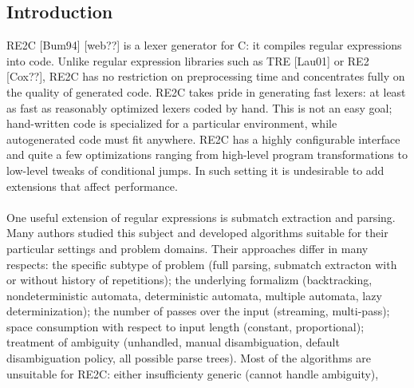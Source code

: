 \documentclass{article}
\theoremstyle{definition}
\begin{document}
\begin{multicols}{2}

\section*{Introduction}

RE2C [Bum94] [web??] is a lexer generator for C: it compiles regular expressions into code.
Unlike regular expression libraries such as TRE [Lau01] or RE2 [Cox??], RE2C has no restriction on preprocessing time
and concentrates fully on the quality of generated code.
RE2C takes pride in generating fast lexers: at least as fast as reasonably optimized lexers coded by hand.
This is not an easy goal; hand-written code is specialized for a particular environment, while autogenerated code must fit anywhere.
RE2C has a highly configurable interface and quite a few optimizations ranging from
high-level program transformations to low-level tweaks of conditional jumps.
In such setting it is undesirable to add extensions that affect performance.
\\ \\
One useful extension of regular expressions is submatch extraction and parsing.
Many authors studied this subject and developed algorithms suitable for their particular settings and problem domains.
Their approaches differ in many respects:
the specific subtype of problem (full parsing, submatch extracton with or without history of repetitions);
the underlying formalizm (backtracking,
nondeterministic automata, deterministic automata, 
multiple automata, lazy determinization);
the number of passes over the input (streaming, multi-pass);
space consumption with respect to input length (constant, proportional);
treatment of ambiguity (unhandled, manual disambiguation, default disambiguation policy, all possible parse trees).
Most of the algorithms are unsuitable for RE2C: either insufficienty generic (cannot handle ambiguity),

\end{multicols}
\end{document}
